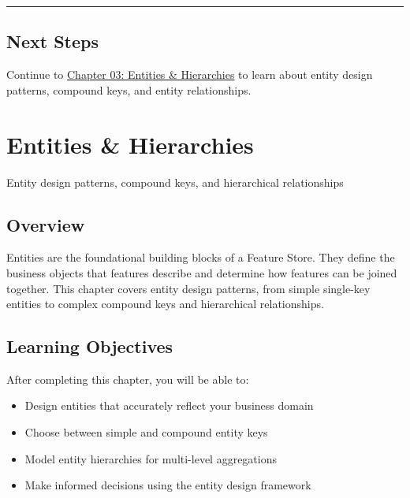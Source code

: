 \documentclass[
  letterpaper,
  DIV=11,
  numbers=noendperiod]{scrreprt}
\providecommand{\tightlist}{%
  \setlength{\itemsep}{0pt}\setlength{\parskip}{0pt}}\usepackage{longtable,booktabs,array}
\begin{document}
\begin{center}\rule{0.5\linewidth}{0.5pt}\end{center}

\hypertarget{next-steps-2}{%
\section{Next Steps}\label{next-steps-2}}

Continue to \protect\hyperlink{entities-hierarchies}{Chapter 03:
Entities \& Hierarchies} to learn about entity design patterns, compound
keys, and entity relationships.

\hypertarget{entities-hierarchies}{%
\chapter{Entities \& Hierarchies}\label{entities-hierarchies}}

Entity design patterns, compound keys, and hierarchical relationships

\hfill\break

\hypertarget{overview-3}{%
\section{Overview}\label{overview-3}}

Entities are the foundational building blocks of a Feature Store. They
define the business objects that features describe and determine how
features can be joined together. This chapter covers entity design
patterns, from simple single-key entities to complex compound keys and
hierarchical relationships.

\hypertarget{learning-objectives-2}{%
\section{Learning Objectives}\label{learning-objectives-2}}

After completing this chapter, you will be able to:

\begin{itemize}
\tightlist
\item
  Design entities that accurately reflect your business domain
\item
  Choose between simple and compound entity keys
\item
  Model entity hierarchies for multi-level aggregations
\item
  Make informed decisions using the entity design framework
\end{itemize}
\end{document}
